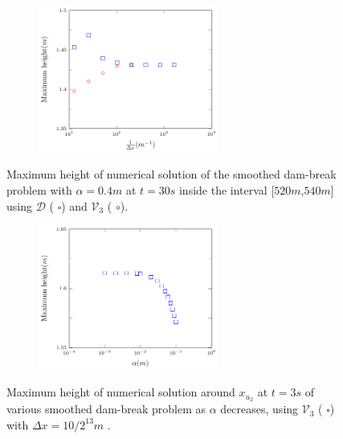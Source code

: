 \documentclass[times]{elsarticle}
\begin{document}
\begin{figure}
	\centering
	\begin{subfigure}{\textwidth}
		\centering
		\includegraphics[width=0.65\textwidth]{pics/results/SDB/cdheight/modamp.pdf}
	\end{subfigure}
	\caption{Maximum height of numerical solution of the smoothed dam-break problem with $\alpha = 0.4m$ at $t=30s$ inside the interval [$520m$,$540m$] using $\mathcal{D}$ ({\color{blue} $\square$}) and $\mathcal{V}_3$ ({\color{red} $\circ$}).}
	\label{fig:maxamp}
\end{figure}

\begin{figure}
	\centering
	\begin{subfigure}{\textwidth}
		\centering
		\includegraphics[width=0.65\textwidth]{pics/results/SDB/cdheight/ampa.pdf}
	\end{subfigure}
	\caption{Maximum height of numerical solution around $x_{u_2}$ at $t=3s$ of various smoothed dam-break problem as $\alpha$ decreases, using $\mathcal{V}_3$ ({\color{blue} $\square$}) with $\Delta x = 10 / 2^{13}m$ .}
	\label{fig:maxampa}
\end{figure}
\end{document}

